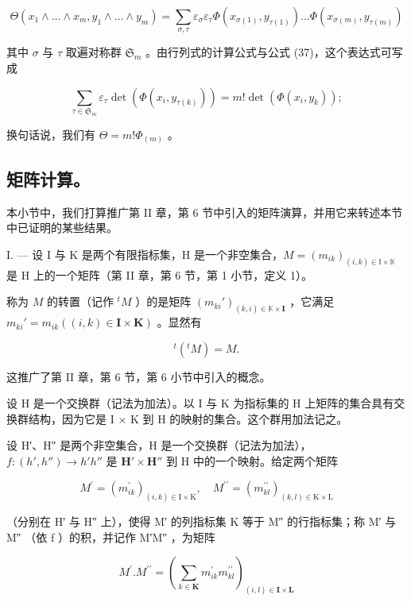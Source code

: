 \[
\Theta (x _ {1} \wedge \dots \wedge x _ {m}, y _ {1} \wedge \dots \wedge y _ {m}) = \sum_ {\sigma , \tau} \varepsilon_ {\sigma} \varepsilon_ {\tau} \Phi (x _ {\sigma (1)}, y _ {\tau (1)}) \dots \Phi (x _ {\sigma (m)}, y _ {\tau (m)})
\]

其中 \(\sigma\) 与 \(\tau\) 取遍对称群 \(\mathfrak{S}_{m}\) 。由行列式的计算公式与公式 (37)，这个表达式可写成

\[
\sum_ {\tau \in \mathfrak {S} _ {m}} \varepsilon_ {\tau} \det (\Phi (x _ {i}, y _ {\tau (k)})) = m! \det (\Phi (x _ {i}, y _ {k}));
\]

换句话说，我们有 \(\Theta = m!\Phi_{(m)}\) 。

\subsection{矩阵计算。}

本小节中，我们打算推广第 II 章，第 6 节中引入的矩阵演算，并用它来转述本节中已证明的某些结果。

I. --- 设 I 与 K 是两个有限指标集，H 是一个非空集合，\(M = (m_{ik})_{(i,k) \in \mathbb{I} \times \mathbb{K}}\) 是 H 上的一个矩阵（第 II 章，第 6 节，第 1 小节，定义 1）。

称为 \(M\) 的转置（记作 \({}^t M\) ）的是矩阵 \((m_{ki}')_{(k,i) \in \mathbb{K} \times \mathbf{I}}\) ，它满足 \(m_{ki}' = m_{ik} ((i, k) \in \mathbf{I} \times \mathbf{K})\) 。显然有

\[
^ {t} (^ {t} M) = M.\tag{39}
\]

这推广了第 II 章，第 6 节，第 6 小节中引入的概念。

设 H 是一个交换群（记法为加法）。以 I 与 K 为指标集的 H 上矩阵的集合具有交换群结构，因为它是 I × K 到 H 的映射的集合。这个群用加法记之。

设 H′、H″ 是两个非空集合，H 是一个交换群（记法为加法），\(f:(h',h'')\to h'h''\) 是 \(\mathbf{H}'\times\mathbf{H}''\) 到 H 中的一个映射。给定两个矩阵

\[
M ^ {\prime} = (m _ {i k} ^ {\prime}) _ {(i, k) \in \mathrm{I} \times \mathrm{K}}, \quad M ^ {\prime \prime} = (m _ {k l} ^ {\prime \prime}) _ {(k, l) \in \mathrm{K} \times \mathrm{L}}
\]

（分别在 H′ 与 H″ 上），使得 M′ 的列指标集 K 等于 M″ 的行指标集；称 M′ 与 M″ （依 f ）的积，并记作 M′M″ ，为矩阵

\[
M ^ {\prime}. M ^ {\prime \prime} = (\sum_ {k \in \mathbf {K}} m _ {i k} ^ {\prime} m _ {k l} ^ {\prime \prime}) _ {(i, l) \in \mathbf {I} \times \mathbf {L}}\tag{40}
\]

